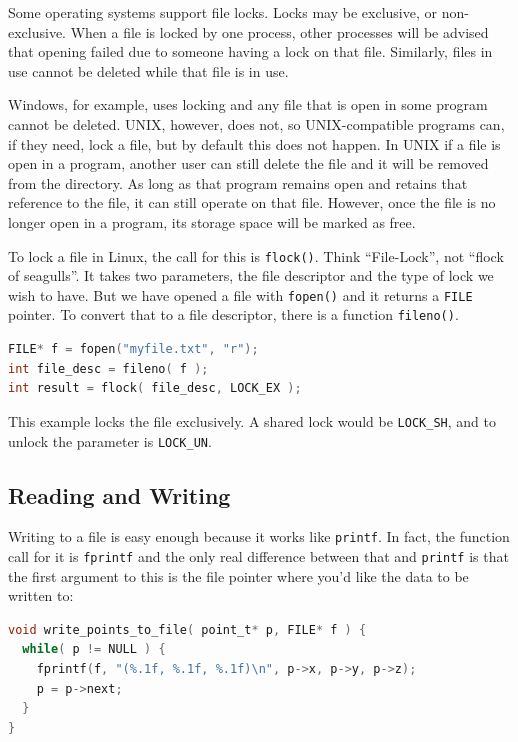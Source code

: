 Some operating systems support file locks. Locks may be exclusive, or non-exclusive. When a file is locked by one process, other processes will be advised that opening failed due to someone having a lock on that file. Similarly, files in use cannot be deleted while that file is in use.

Windows, for example, uses locking and any file that is open in some program cannot be deleted. UNIX, however, does not, so UNIX-compatible programs can, if they need, lock a file, but by default this does not happen. In UNIX if a file is open in a program, another user can still delete the file and it will be removed from the directory. As long as that program remains open and retains that reference to the file, it can still operate on that file. However, once the file is no longer open in a program, its storage space will be marked as free.

To lock a file in Linux, the call for this is \texttt{flock()}. Think ``File-Lock'', not ``flock of seagulls''. It takes two parameters, the file descriptor and the type of lock we wish to have. But we have opened a file with \texttt{fopen()} and it returns a \texttt{FILE} pointer. To convert that to a file descriptor, there is a function \texttt{fileno()}.

\begin{lstlisting}[language=C]
FILE* f = fopen("myfile.txt", "r");
int file_desc = fileno( f );
int result = flock( file_desc, LOCK_EX );
\end{lstlisting}

This example locks the file exclusively. A shared lock would be \texttt{LOCK\_SH}, and to unlock the parameter is \texttt{LOCK\_UN}.

\subsection*{Reading and Writing}

Writing to a file is easy enough because it works like \texttt{printf}. In fact, the function call for it is \texttt{fprintf} and the only real difference between that and \texttt{printf} is that the first argument to this is the file pointer where you'd like the data to be written to:

\begin{lstlisting}[language=C]
void write_points_to_file( point_t* p, FILE* f ) {
  while( p != NULL ) {
    fprintf(f, "(%.1f, %.1f, %.1f)\n", p->x, p->y, p->z);
    p = p->next;
  }
}
\end{lstlisting}


